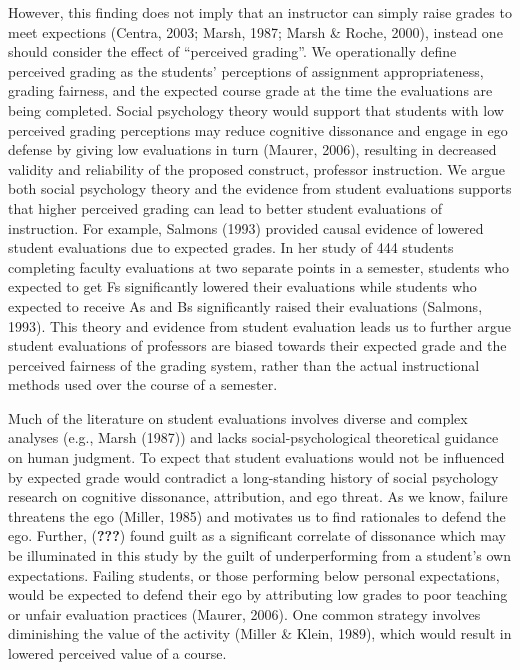 \documentclass[,man]{apa6}
\theoremstyle{definition}
\theoremstyle{definition}
\theoremstyle{definition}
\theoremstyle{remark}
\begin{document}
However, this finding does not imply that an instructor can simply raise
grades to meet expections (Centra, 2003; Marsh, 1987; Marsh \& Roche,
2000), instead one should consider the effect of \enquote{perceived
grading}. We operationally define perceived grading as the students'
perceptions of assignment appropriateness, grading fairness, and the
expected course grade at the time the evaluations are being completed.
Social psychology theory would support that students with low perceived
grading perceptions may reduce cognitive dissonance and engage in ego
defense by giving low evaluations in turn (Maurer, 2006), resulting in
decreased validity and reliability of the proposed construct, professor
instruction. We argue both social psychology theory and the evidence
from student evaluations supports that higher perceived grading can lead
to better student evaluations of instruction. For example, Salmons
(1993) provided causal evidence of lowered student evaluations due to
expected grades. In her study of 444 students completing faculty
evaluations at two separate points in a semester, students who expected
to get Fs significantly lowered their evaluations while students who
expected to receive As and Bs significantly raised their evaluations
(Salmons, 1993). This theory and evidence from student evaluation leads
us to further argue student evaluations of professors are biased towards
their expected grade and the perceived fairness of the grading system,
rather than the actual instructional methods used over the course of a
semester.

Much of the literature on student evaluations involves diverse and
complex analyses (e.g., Marsh (1987)) and lacks social-psychological
theoretical guidance on human judgment. To expect that student
evaluations would not be influenced by expected grade would contradict a
long-standing history of social psychology research on cognitive
dissonance, attribution, and ego threat. As we know, failure threatens
the ego (Miller, 1985) and motivates us to find rationales to defend the
ego. Further, ({\textbf{???}}) found guilt as a significant correlate of
dissonance which may be illuminated in this study by the guilt of
underperforming from a student's own expectations. Failing students, or
those performing below personal expectations, would be expected to
defend their ego by attributing low grades to poor teaching or unfair
evaluation practices (Maurer, 2006). One common strategy involves
diminishing the value of the activity (Miller \& Klein, 1989), which
would result in lowered perceived value of a course.
\end{document}
